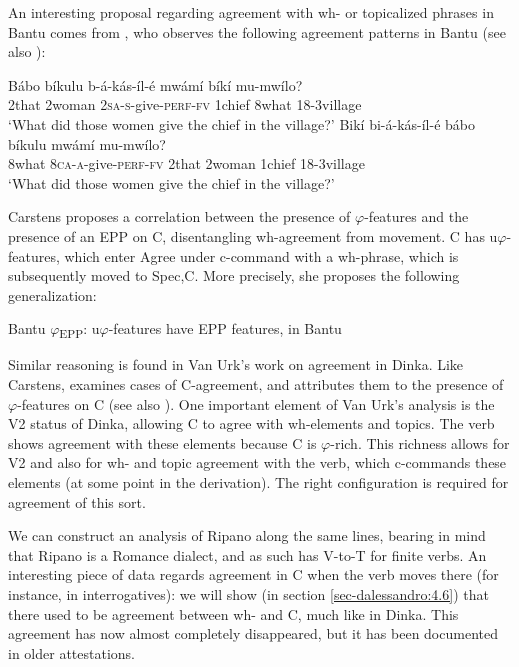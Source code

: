 \documentclass[output=paper
,modfonts
,nonflat]{langsci/langscibook}
\begin{document}
An interesting proposal regarding agreement with wh- or topicalized phrases in Bantu comes from \citet{Carstens2005a}, who observes the following agreement patterns in Bantu (see also ):

\begin{exe}
\ex \citet[220]{Carstens2005a} \xlist
\ex
\gll Bábo bíkulu   b-á-kás-íl-é     mwámí bíkí mu-mwílo?\\
	2that   2woman   \textsc{2sa-s}{}-give-\textsc{perf-fv} 1chief 8what  18-3village\\ 
\glt `What did those women give the chief in the village?'
\ex
\gll Bikí   bi-á-kás-íl-é   bábo bíkulu   mwámí   mu-mwílo?\\
	8what   \textsc{8ca-a-}give-\textsc{perf-fv} 2that 2woman 1chief 18-3village \\
\glt `What did those women give the chief in the village?'
\endxlist
\end{exe}
Carstens proposes a correlation between the presence of $\varphi $-features and the presence of an EPP on C, disentangling wh-agreement from movement. C has u$\varphi $-features, which enter Agree under c-command with a wh-phrase, which is subsequently moved to Spec,C. More precisely, she proposes the following generalization:

\begin{exe}
\ex Bantu $\varphi $\textsubscript{EPP}: u$\varphi $-features have EPP features, in Bantu \citep[222]{Carstens2005a}
\end{exe}
Similar reasoning is found in Van Urk’s work on agreement in Dinka. Like Carstens, \citet{Van_Urk2015} examines cases of C-agreement, and attributes them to the presence of $\varphi $-features on C (see also \citealt{Haegeman_Van_Koppen2012}). One important element of Van Urk’s analysis is the V2 status of Dinka, allowing C to agree with wh-elements and topics. The verb shows agreement with these elements because C is $\varphi $-rich. This richness allows for V2 and also for wh- and topic agreement with the verb, which c-commands these elements (at some point in the derivation). The right configuration is required for agreement of this sort.

We can construct an analysis of Ripano along the same lines, bearing in mind that Ripano is a Romance dialect, and as such has V-to-T for finite verbs. An interesting piece of data regards agreement in C when the verb moves there (for instance, in interrogatives): we will show (in section \ref{sec-dalessandro:4.6}) that there used to be agreement between wh- and C, much like in Dinka. This agreement has now almost completely disappeared, but it has been documented in older attestations.
\end{document}

